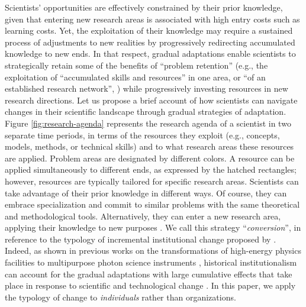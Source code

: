 \documentclass{article}
\begin{document}
Scientists' opportunities are effectively constrained by their prior knowledge, given that entering new research areas is associated with high entry costs such as learning costs. Yet, the exploitation of their knowledge may require a sustained process of adjustments to new realities by progressively redirecting accumulated knowledge to new ends. In that respect, gradual adaptations enable scientists to strategically retain some of  the benefits of ``problem retention'' (e.g., the exploitation of ``accumulated skills and resources'' in one area, or ``of an established research network'', \citealt[p.~106]{Gieryn1978}) while progressively investing resources in new research directions. Let us propose a brief account of how scientists can navigate changes in their scientific landscape through gradual strategies of adaptation. Figure \ref{fig:research-agenda} %
represents the research agenda of a scientist in two separate time periods, in terms of the resources they exploit (e.g., concepts, models, methods, or technical skills) and to what research areas these resources are applied. Problem areas are designated by different colors. A resource can be applied simultaneously to different ends, as expressed by the hatched rectangles; however, resources are typically tailored for specific research areas. Scientists can take advantage of their prior knowledge in different ways. Of course, they can embrace specialization and commit to similar problems with the same theoretical and methodological tools.  
Alternatively, they can enter a new research area, applying their knowledge to new purposes \citep{Mulkay1974,schon1963displacement}. We call this strategy ``\textit{conversion}'', in reference to the typology of incremental institutional change proposed by \citet{mahoney_thelen_2009}. Indeed, as shown in previous works on the transformations of high-energy physics facilities to multipurpose photon science instruments \citep{Hallonsten2013,Heinze2017a}, historical institutionalism can account for the gradual adaptations with large cumulative effects that take place in response to scientific and technological change \citep{Heinze2012}. In this paper, we apply the typology of change to \textit{individuals} rather than organizations. 
\end{document}
